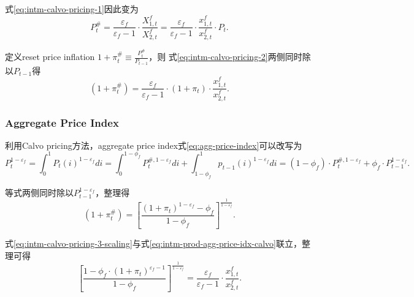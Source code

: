 式\eqref{eq:intm-calvo-pricing-1}因此变为
\begin{equation}
  \label{eq:intm-calvo-pricing-2}
  P_t^{\#} = \frac{\varepsilon_f}{\varepsilon_f - 1} \cdot \frac{X_{1,t}^f}{X_{2,t}^f} = \frac{\varepsilon_f}{\varepsilon_f - 1} \cdot \frac{x_{1,t}^f}{x_{2,t}^f} \cdot P_t.
\end{equation}

定义reset price inflation $1+\pi_t^{\#} \equiv \frac{P_t^{\#}}{P_{t-1}}$，则  式\eqref{eq:intm-calvo-pricing-2}两侧同时除以$P_{t-1}$得
  \begin{equation}
    \label{eq:intm-calvo-pricing-3-scaling}
    (1+\pi_t^{\#}) = \frac{\varepsilon_f}{\varepsilon_f -1} \cdot (1 + \pi_{t}) \cdot \frac{x_{1,t}^f}{x_{2,t}^f}.
  \end{equation}


\subsubsection{Aggregate Price Index}
\label{intm-aggregate-price-index}

利用Calvo pricing方法\citep{Calvo:1983uqa}，aggregate price index式\eqref{eq:agg-price-index}可以改写为
\begin{equation*}
  P_t^{1-\varepsilon_f} = \int_{0}^1 P_t(i)^{1-\varepsilon_f} di = \int_{0}^{1-\phi_f} P_t^{\#,1-\varepsilon_f} di + \int_{1-\phi_f}^{1}p_{t-1}(i)^{1-\varepsilon_f} di = (1-\phi_f) \cdot P_t^{\#,1-\varepsilon_f}  + \phi_f \cdot P_{t-1}^{1-\varepsilon_f}.
\end{equation*}

等式两侧同时除以$P_{t-1}^{1-\varepsilon_f}$，整理得
\begin{equation}
  \label{eq:intm-prod-agg-price-idx-calvo}
  (1+\pi_t^{\#}) = \left[\frac
{
  (1+\pi_t)^{1-\varepsilon_f} - \phi_f
}
{
  1-\phi_f
}\right]^{\frac{1}{1-\varepsilon_f}}.
\end{equation}

式\eqref{eq:intm-calvo-pricing-3-scaling}与式\eqref{eq:intm-prod-agg-price-idx-calvo}联立，整理可得
\begin{equation}
    \label{eq:intm-prod-agg-price-idx-calvo-aux}
    \left[
      \frac{
        1-\phi_f \cdot (1+\pi_t)^{\varepsilon_f -1}
      }{
        1-\phi_f
      }
    \right]^{\frac{1}{1-\varepsilon_f}} = \frac{\varepsilon_f}{\varepsilon_f -1} \cdot \frac{x_{1,t}^f}{x_{2,t}^f}.
\end{equation}

